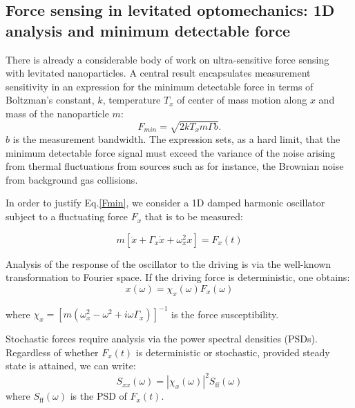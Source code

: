 \documentclass[twocolumn,english,notitlepage,superscriptaddress,nofootinbib]{revtex4-2}
\begin{document}
\subsection{ Force sensing in levitated optomechanics: 1D analysis and  minimum detectable force}

There is already a considerable body of work on ultra-sensitive force sensing ~\cite{millen2020optomechanics, Geraci2016,hebestreit2018sensing,dark_matter_3, liang2023yoctonewton, hempston2017force,timberlake2019static} with levitated nanoparticles.
A central result encapsulates measurement sensitivity  in an expression for the minimum detectable force in terms of Boltzman's constant, $k$,  temperature $T_x$ of center of mass motion along $x$ and mass of the nanoparticle $m$:
\begin{equation}\label{Fmin}
 F_{min}= \sqrt{ 2 k T_x m \Gamma b}.
\end{equation}
$b$ is the measurement bandwidth.  The expression  sets,  as a hard limit,  that the minimum detectable force signal must exceed the variance of the noise arising from thermal fluctuations  from sources such as for instance, the Brownian noise from background gas collisions.

 In order to justify Eq.\ref{Fmin}, we  consider a 1D damped harmonic oscillator subject to a fluctuating force $F_x$ that is to be measured:

\begin{equation}
m \left[\ddot{x}+\Gamma_x \dot{x}+\omega_x^2 x\right]=F_x(t)
\end{equation}

Analysis of the response of the oscillator to the driving is via the well-known transformation to Fourier space.
If the driving force is deterministic,  one obtains:
\begin{equation}
 x(\omega)= \chi_x(\omega) F_x(\omega)
  \label{ForceX}
\end{equation}
 
where $\chi_x=[m(\omega_x^2-\omega^2+i \omega \Gamma_x)]^{-1}$ is the force susceptibility.

Stochastic forces require analysis via the power spectral densities (PSDs).
Regardless of whether $F_x(t)$ is deterministic or stochastic,  provided steady state is attained,  we can write:
\begin{equation}
  S_{xx}(\omega) =|\chi_x(\omega)|^2 S_{\text{ff}} (\omega)
 \label{Force}
\end{equation}
where  $S_{\text{ff}} (\omega)$ is the PSD of $F_x(t)$.
\end{document}
